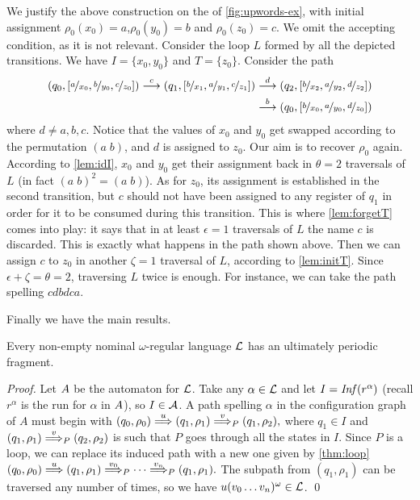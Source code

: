 \begin{example} We justify the above construction on the \hdma{} of \cref{fig:upwords-ex}, with initial assignment $\rho_0(x_0) = a$,$\rho_0(y_0) = b$ and $\rho_0(z_0) = c$. We omit the accepting condition, as it is not relevant. Consider the loop $L$ formed by all the depicted transitions.
We have $I = \{x_0,y_0\}$ and $T = \{z_0\}$. Consider the path
\begin{align*}
	(q_0,[\nicefrac{a}{x_0},\nicefrac{b}{y_0},\nicefrac{c}{z_0}]) \overset{c}{\longrightarrow} (q_1,[\nicefrac{b}{x_1},\nicefrac{a}{y_1},\nicefrac{c}{z_1}]) &\overset{d}{\longrightarrow} (q_2,[\nicefrac{b}{x_2},\nicefrac{a}{y_2},\nicefrac{d}{z_2}]) \\
	&\overset{b}{\longrightarrow} (q_0,[\nicefrac{b}{x_0},\nicefrac{a}{y_0},\nicefrac{d}{z_0}])
\end{align*}
where $d \neq a,b,c$. Notice that the values of $x_0$ and $y_0$ get swapped according to the permutation $(a \; b)$, and $d$ is assigned to $z_0$. Our aim is to recover $\rho_0$ again. According to \cref{lem:idI}, $x_0$ and $y_0$ get their assignment back in $\theta = 2$ traversals of $L$ (in fact $(a\; b)^2 = (a\; b)$). As for $z_0$, its assignment is established in the second transition, but $c$ should not have been assigned to any register of $q_1$ in order for it to be consumed during this transition. This is where \cref{lem:forgetT} comes into play: it says that in at least $\epsilon = 1$ traversals of $L$ the name $c$ is discarded. This is exactly what happens in the path shown above. Then we can assign $c$ to $z_0$ in another $\zeta = 1$ traversal of $L$, according to \cref{lem:initT}. Since $\epsilon + \zeta  = \theta = 2$, traversing $L$ twice is enough. For instance, we can take the path spelling $cdbdca$.
\end{example}
%
Finally we have the main results.
%
\begin{theorem}
\label{thm:up-fragment}
Every non-empty nominal $\omega$-regular language $\mathcal{L}$ has an ultimately periodic fragment.
\end{theorem}
\begin{proof}
Let $A$ be the automaton for $\mathcal{L}$. Take any $\alpha \in \mathcal{L}$ and let $I = \mathit{Inf}(r^\alpha)$ (recall $r^\alpha$ is the run for $\alpha$ in $A$), so $I \in \mathcal{A}$. A path spelling $\alpha$ in the configuration graph of $A$ must begin with
$
	(q_0,\rho_0) \overset{u}{\Longrightarrow} (q_1,\rho_1) \overset{v}{\Longrightarrow}_{P} (q_1,\rho_2),
$
where $q_1 \in I$ and $(q_1,\rho_1) \overset{v}{\Longrightarrow}_{P} (q_2,\rho_2)$ is such that $P$ goes through all the states in $I$. Since $P$ is a loop, we can replace its induced path with a new one given by \cref{thm:loop} 
$
	(q_0,\rho_0) \overset{u}{\Longrightarrow} (q_1,\rho_1) \overset{v_0}{\Longrightarrow}_{P} \cdots \overset{v_n}{\Longrightarrow}_{P} (q_1,\rho_1).
$
The subpath from $(q_1,\rho_1)$ can be traversed any number of times, so we have $u(v_0\dots v_n)^\omega \in \mathcal{L}$.
\qed
\end{proof}

